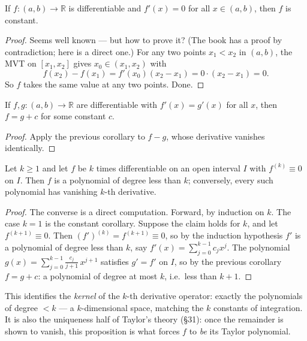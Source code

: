 \documentclass[11pt]{report}
\begin{document}
\begin{corbox}
If $f: (a,b) \to \mathbb{R}$ is differentiable and $f'(x) = 0$ for all $x \in (a,b)$, then $f$ is constant.
\end{corbox}

\begin{proof}
Seems well known --- but how to prove it? (The book has a proof by contradiction; here is a direct one.) For any two points $x_1 < x_2$ in $(a,b)$, the MVT on $[x_1, x_2]$ gives $x_0 \in (x_1, x_2)$ with
\[
f(x_2) - f(x_1) = f'(x_0)(x_2 - x_1) = 0 \cdot (x_2 - x_1) = 0.
\]
So $f$ takes the same value at any two points. Done.
\end{proof}

\begin{corbox}
If $f, g: (a,b) \to \mathbb{R}$ are differentiable with $f'(x) = g'(x)$ for all $x$, then $f = g + c$ for some constant $c$.
\end{corbox}

\begin{proof}
Apply the previous corollary to $f - g$, whose derivative vanishes identically.
\end{proof}

\begin{propbox}
Let $k \geq 1$ and let $f$ be $k$ times differentiable on an open interval $I$ with $f^{(k)} \equiv 0$ on $I$. Then $f$ is a polynomial of degree less than $k$; conversely, every such polynomial has vanishing $k$-th derivative.
\end{propbox}

\begin{proof}
The converse is a direct computation. Forward, by induction on $k$. The case $k = 1$ is the constant corollary. Suppose the claim holds for $k$, and let $f^{(k+1)} \equiv 0$. Then $(f')^{(k)} = f^{(k+1)} \equiv 0$, so by the induction hypothesis $f'$ is a polynomial of degree less than $k$, say $f'(x) = \sum_{j=0}^{k-1} c_j x^j$. The polynomial $g(x) = \sum_{j=0}^{k-1} \tfrac{c_j}{j+1}\, x^{j+1}$ satisfies $g' = f'$ on $I$, so by the previous corollary $f = g + c$: a polynomial of degree at most $k$, i.e.\ less than $k + 1$.
\end{proof}

\begin{rembox}
This identifies the \emph{kernel} of the $k$-th derivative operator: exactly the polynomials of degree $< k$ --- a $k$-dimensional space, matching the $k$ constants of integration. It is also the uniqueness half of Taylor's theory (\S 31): once the remainder is shown to vanish, this proposition is what forces $f$ to \emph{be} its Taylor polynomial.
\end{rembox}
\end{document}
